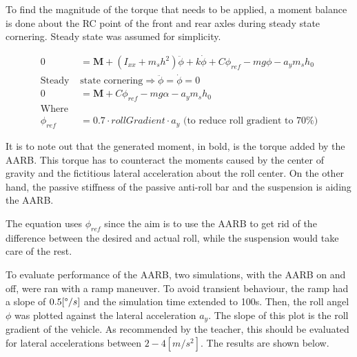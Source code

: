 To find the magnitude of the torque that needs to be applied, a moment balance is done about the RC point of the front and rear axles during steady state cornering. Steady state was assumed for simplicity.  

\begin{align*}
    0 &= \textbf{M} + (I_{xx}+m_sh^2)\ddot{\phi} + k \Dot{\phi} + C \phi_{ref} - mg\phi -a_ym_sh_0\\
      \text{Steady } & \text{state cornering} \Rightarrow \ddot{\phi} =\dot{\phi} =0 \\
    0 &= \textbf{M} + C \phi_{ref} - mg\alpha -a_ym_sh_0\\
    \text{Where}&\\
    \phi_{ref} &= 0.7\cdot rollGradient\cdot a_y \text{ (to reduce roll gradient to 70\%)}
\end{align*}


It is to note out that the generated moment, in bold, is the torque added by the AARB. This torque has to counteract the moments caused by the center of gravity and the fictitious lateral acceleration about the roll center. On the other hand, the passive stiffness of the passive anti-roll bar and the suspension is aiding the AARB.

The equation uses $\phi_{ref}$ since the aim is to use the AARB to get rid of the difference between the desired and actual roll, while the suspension would take care of the rest.


To evaluate performance of the AARB, two simulations, with the AARB on and off, were ran with a ramp maneuver. To avoid transient behaviour, the ramp had a slope of $0.5[\degree/s]$ and the simulation time extended to 100s. Then, the roll angel $\phi$ was plotted against the lateral acceleration $a_y$. The slope of this plot is the roll gradient of the vehicle. As recommended by the teacher, this should be evaluated for lateral accelerations between $2-4[m/s^2]$. The results are shown below. 

